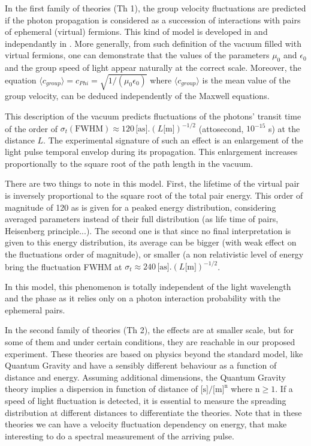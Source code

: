 \documentclass[9pt, a4, twoside]{article}
\begin{document}
In the first family of theories (Th 1), the group velocity fluctuations are predicted if the photon propagation is considered as a succession of interactions with pairs of ephemeral (virtual) fermions. This kind of model is developed in \cite{baseTh} and independantly  in \cite{baseTh2}. More generally, from such definition of the vacuum filled with virtual fermions, one can demonstrate that the values of the parameters $\mu_0$ and $\epsilon_0$ and the group speed of light appear naturally at the correct scale. Moreover, the equation $\langle c_{group}\rangle  = c_{Phi} = \sqrt{1/(\mu_0\epsilon_0)}$ where $\langle c_{group}\rangle$ is the mean value of the group velocity, can be deduced independently of the Maxwell equations.

This description of the vacuum predicts fluctuations of the photons' transit time of the order of $\sigma_t(\text{FWHM}) \approx 120\, \text{[as]}.(L\text{[m]})^{-1/2}$ (attosecond, $10^{-15}$ s) at the distance $L$. The experimental signature of such an effect is an enlargement of the light pulse temporal envelop during its propagation. This enlargement increases proportionally to the square root of the path length in the vacuum.

There are two things to note in this model. First, the lifetime of the virtual pair is inversely proportional to the  square root of the total pair energy. This order of magnitude of 120 as is given for a peaked energy distribution, considering averaged parameters instead of their full distribution (as life time of pairs, Heisenberg principle...). The second one is that since no final interpretation is given to this energy distribution, its average can be bigger (with weak effect on the fluctuations order of magnitude), or smaller (a non relativistic level of energy bring the fluctuation FWHM at $\sigma_t \approx 240\, \text{[as]}.(L\text{[m]})^{-1/2}$. 

In this model, this phenomenon is totally independent of  the light wavelength and the phase as it relies only on a photon interaction probability with the ephemeral pairs.

In the second family of theories (Th 2), the effects are at smaller scale, but for some of them and under certain conditions, they are reachable in our proposed experiment. These theories are based on physics beyond the standard model, like Quantum Gravity \cite{gravcite} and have a sensibly different behaviour as a function of distance and energy. 
Assuming additional dimensions, the Quantum Gravity theory implies a dispersion in function of distance of $\text{[s]}/\text{[m]}^\text{n}$ where $\text {n} \geq 1$. If a speed of light fluctuation is detected, it is essential to measure the spreading distribution at different distances to differentiate the theories. Note that in these theories we can have a velocity fluctuation dependency on energy, that make interesting to do a spectral measurement of the arriving pulse.
\end{document}
